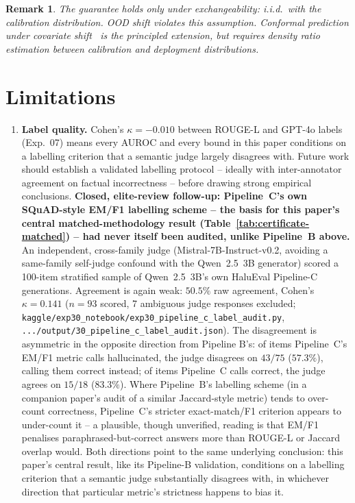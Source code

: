 \documentclass[10pt,twocolumn]{article}
\newcommand{\FloatBarrier}{\clearpage}
\newtheorem{remark}{Remark}
\begin{document}
\begin{remark}
The guarantee holds only under exchangeability: i.i.d.\ with the
calibration distribution. OOD shift violates this assumption.
Conformal prediction under covariate
shift~\citep{tibshirani2019conformal} is the principled extension, but
requires density ratio estimation between calibration and deployment
distributions.
\end{remark}

\FloatBarrier
\section{Limitations}
\label{sec:limitations}

\begin{enumerate}[leftmargin=*, topsep=2pt, itemsep=2pt]

\item \textbf{Label quality.} Cohen's $\kappa = -0.010$ between
  ROUGE-L and GPT-4o labels (Exp.~07) means every AUROC and every bound
  in this paper conditions on a labelling criterion that a semantic
  judge largely disagrees with. Future work should establish a
  validated labelling protocol -- ideally with inter-annotator agreement
  on factual incorrectness -- before drawing strong empirical
  conclusions. \textbf{Closed, elite-review follow-up: Pipeline~C's own
  SQuAD-style EM/F1 labelling scheme -- the basis for this paper's
  central matched-methodology result (Table~\ref{tab:certificate-matched})
  -- had never itself been audited, unlike Pipeline~B above.} An
  independent, cross-family judge (Mistral-7B-Instruct-v0.2, avoiding a
  same-family self-judge confound with the Qwen~2.5~3B generator) scored
  a 100-item stratified sample of Qwen~2.5~3B's own HaluEval Pipeline-C
  generations. Agreement is again weak: $50.5\%$ raw agreement, Cohen's
  $\kappa = 0.141$ ($n=93$ scored, 7 ambiguous judge responses excluded;
  \texttt{kaggle/exp30\_notebook/exp30\_pipeline\_c\_label\_audit.py},
  \texttt{.../output/30\_pipeline\_c\_label\_audit.json}).
  The disagreement is asymmetric in the opposite direction from Pipeline
  B's: of items Pipeline~C's EM/F1 metric calls hallucinated, the judge
  disagrees on $43/75$ ($57.3\%$), calling them correct instead; of
  items Pipeline~C calls correct, the judge agrees on $15/18$
  ($83.3\%$). Where Pipeline~B's labelling scheme (in a companion
  paper's audit of a similar Jaccard-style metric) tends to
  over-count correctness, Pipeline~C's stricter exact-match/F1
  criterion appears to under-count it -- a plausible, though unverified,
  reading is that EM/F1 penalises paraphrased-but-correct answers more
  than ROUGE-L or Jaccard overlap would. Both directions point to the
  same underlying conclusion: this paper's central result, like its
  Pipeline-B validation, conditions on a labelling criterion that a
  semantic judge substantially disagrees with, in whichever direction
  that particular metric's strictness happens to bias it.


\end{enumerate}
\end{document}
